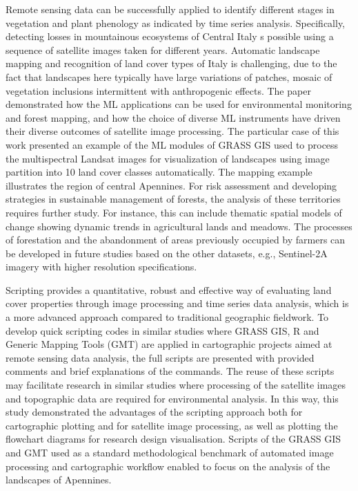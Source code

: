 \documentclass[jimaging,article,submit,pdftex,moreauthors]{Definitions/mdpi}
\begin{document}
Remote sensing data can be successfully applied to identify different stages in vegetation and plant phenology as indicated by time series analysis. Specifically, detecting losses in mountainous ecosystems of Central Italy s possible using a sequence of satellite images taken for different years. Automatic landscape mapping and recognition of land cover types of Italy is challenging, due to the fact that landscapes here typically have large variations of patches, mosaic of vegetation inclusions intermittent with anthropogenic effects. The paper demonstrated how the ML applications can be used for environmental monitoring and forest mapping, and how the choice of diverse ML instruments have driven their diverse outcomes of satellite image processing. The particular case of this work presented an example of the ML modules of GRASS GIS used to process the multispectral Landsat images for visualization of landscapes using image partition into 10 land cover classes automatically. The mapping example illustrates the region of central Apennines. For risk assessment and developing strategies in sustainable management of forests, the analysis of these territories requires further study. For instance, this can include thematic spatial models of change showing dynamic trends in agricultural lands and meadows. The processes of forestation and the abandonment of areas previously occupied by farmers can be developed in future studies based on the other datasets, e.g., Sentinel-2A imagery with higher resolution specifications.

Scripting provides a quantitative, robust and effective way of evaluating land cover properties through image processing and time series data analysis, which is a more advanced approach compared to traditional geographic fieldwork. To develop quick scripting codes in similar studies where GRASS GIS, R and Generic Mapping Tools (GMT) are applied in cartographic projects aimed at remote sensing data analysis, the full scripts are presented with provided comments and brief explanations of the commands. The reuse of these scripts may facilitate research in similar studies where processing of the satellite images and topographic data are required for environmental analysis. In this way, this study demonstrated the advantages of the scripting approach both for cartographic plotting and for satellite image processing, as well as plotting the flowchart diagrams for research design visualisation. Scripts of the GRASS GIS and GMT used as a standard methodological benchmark of automated image processing and cartographic workflow enabled to focus on the analysis of the landscapes of Apennines. 
\end{document}
